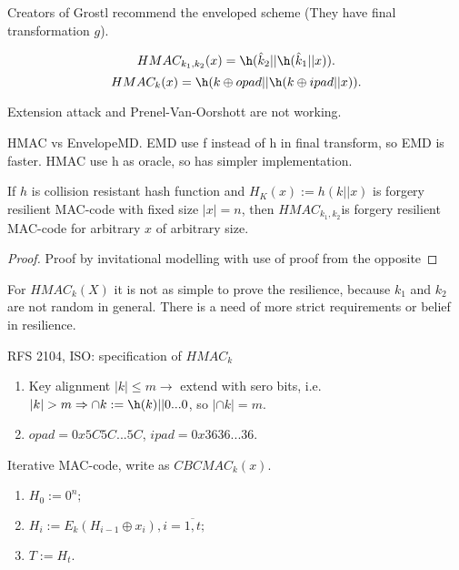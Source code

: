 \begin{remark}
    Creators of Grostl recommend the enveloped scheme (They have final transformation $g$).
\end{remark}

\begin{definition}
    $$HMAC_{k_1, k_2}(x) = \h(\hat{k}_2 || \h(\hat{k}_1 || x)).$$
    $$HMAC_{k}(x) = \h(k \oplus opad || \h(k \oplus ipad || x)).$$
\end{definition}

\begin{remark}
    Extension attack and Prenel-Van-Oorshott are not working.
\end{remark}

\begin{remark}
    HMAC vs EnvelopeMD. EMD use f instead of h in final transform, so EMD is faster. HMAC use h as oracle, so has simpler implementation. 
\end{remark}

\begin{theorem}
    If $h$ is collision resistant hash function and $H_K(x) := h(k||x)$ is forgery resilient MAC-code with fixed size $|x| = n$, then $HMAC_{k_1, k_2}$is forgery resilient MAC-code for arbitrary $x$ of arbitrary size.
\end{theorem}
\begin{proof}
    Proof by invitational modelling with use of proof from the opposite 
\end{proof}

\begin{remark}
    For $HMAC_{k}(X)$ it is not as simple to prove the resilience, because $k_1$ and $k_2$ are not random in general. There is a need of more strict requirements or belief in resilience.
\end{remark}

\begin{remark}
    RFS 2104, ISO: specification of $HMAC_k$
    \begin{enumerate}
        \item Key alignment $|k| \leqslant m \rightarrow$ extend with sero bits, i.e. $|k| > m \Rightarrow \cap{k} := \h(k)||0...0$, so  $|\cap{k}| = m$.
        \item $opad = 0x5C5C...5C$, $ipad = 0x3636...36$.
    \end{enumerate}
\end{remark}


\begin{definition}
    Iterative MAC-code, write as $CBCMAC_k(x)$.
    \begin{enumerate}
        \item $H_0 := 0^n;$
        \item $H_i := E_k(H_{i-1} \oplus x_i), i = \overline{1, t};$
        \item $T := H_t.$
    \end{enumerate}
\end{definition}

